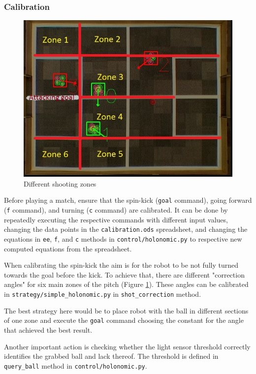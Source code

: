\documentclass[a4paper,12pt]{article}
\begin{document}
\subsubsection{Calibration}

\begin{figure}
\centering
\includegraphics[scale=.4]{zones.jpg}
\caption{Different shooting zones}
\label{fig:zones}
\end{figure}
Before playing a match, ensure that the spin-kick (\texttt{goal} command), going forward (\texttt{f} command), and turning (\texttt{c} command) are calibrated. It can be done by repeatedly executing the respective commands with different input values, changing the data points in the \texttt{calibration.ods} spreadsheet, and changing the equations in \texttt{ee}, \texttt{f}, and \texttt{c} methods in \texttt{control/holonomic.py} to respective new computed equations from the spreadsheet. 

When calibrating the spin-kick the aim is for the robot to be not fully turned towards the goal before the kick. To achieve that, there are different "correction angles" for six main zones of the pitch (Figure  \ref{fig:zones}). These angles can be calibrated in \texttt{strategy/simple\_holonomic.py} in \texttt{shot\_correction} method. 

The best strategy here would be to place robot with the ball in different sections of one zone and execute the \texttt{goal} command choosing the constant for the angle that achieved the best result.

Another important action is checking whether the light sensor threshold correctly identifies the grabbed ball and lack thereof. The threshold is defined in \texttt{query\_ball} method in \texttt{control/holonomic.py}.
\end{document}
